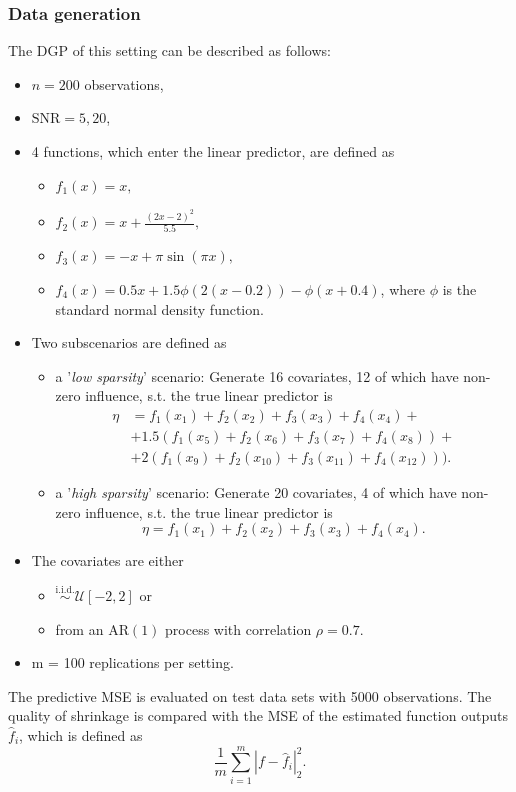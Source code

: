 \documentclass[12pt,letterpaper]{article}
\numberwithin{equation}{subsection}
\begin{document}
\subsubsection{Data generation}
The DGP of this setting can be described as follows:
\begin{itemize}
\item $n = 200$ observations,
\item $\text{SNR} = 5, 20$,
\item 4 functions, which enter the linear predictor, are defined as
\begin{itemize}
\item $f_1(x) = x,$
\item $f_2(x) = x + \frac{(2x-2)^2}{5.5},$
\item $f_3(x) = -x + \pi\sin(\pi x),$
\item $f_4(x) = 0.5x + 1.5\phi(2(x-0.2))-\phi(x+0.4)$, where $\phi$ is the standard normal density function.
\end{itemize}
\item Two subscenarios are defined as
\begin{itemize}
\item a '\textit{low sparsity}' scenario: Generate 16 covariates, 12 of which have non-zero influence, s.t. the true linear predictor is 
\begin{align*}
\eta & = f_1(x_1) + f_2(x_2) + f_3(x_3) + f_4(x_4) + \\
& + 1.5( f_1(x_5) + f_2(x_6) + f_3(x_7) + f_4(x_8)) + \\ 
& + 2(f_1(x_9) + f_2(x_{10}) + f_3(x_{11}) + f_4(x_{12})) ).
\end{align*}
\item a '\textit{high sparsity}' scenario: Generate 20 covariates, 4 of which have non-zero influence, s.t. the true linear predictor is 
\begin{equation*}
\eta = f_1(x_1) + f_2(x_2) + f_3(x_3) + f_4(x_4). 
\end{equation*}
\end{itemize}
\item The covariates are either 
\begin{itemize}
\item $\overset{\text{i.i.d.}}{\sim} \mathcal{U}[-2,2]$ or 
\item from an $\text{AR}(1)$ process with correlation $\rho = 0.7$.
\end{itemize}
\item m = 100 replications per setting.
\end{itemize}
The predictive MSE is evaluated on test data sets with 5000 observations. The quality of shrinkage is compared with the MSE of the estimated function outputs$\hat{f}_i$, which is defined as
\[
\frac{1}{m}\sum^m_{i=1}|f - \hat{f}_i|^2_2.
\]
\label{sec:sfdgp}
\end{document}

